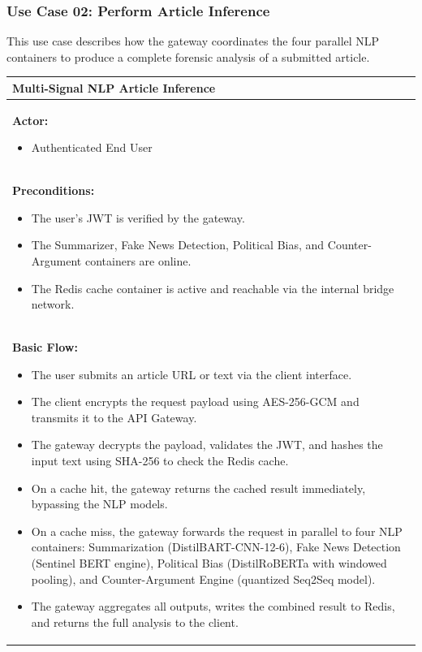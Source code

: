 \subsubsection{Use Case 02: Perform Article Inference}
This use case describes how the gateway coordinates the four parallel NLP containers to produce a complete forensic analysis of a submitted article.
\begin{table}[H]
    \renewcommand{\arraystretch}{1.3}
    \begin{tabularx}{\textwidth}{| X |}
        \hline
        \textbf{Multi-Signal NLP Article Inference} \\
        \hline
        \textbf{Actor:}
        \begin{itemize}
            \item Authenticated End User
        \end{itemize} \\
        \hline
        \textbf{Preconditions:}
        \begin{itemize}
            \item The user's JWT is verified by the gateway.
            \item The Summarizer, Fake News Detection, Political Bias, and Counter-Argument containers are online.
            \item The Redis cache container is active and reachable via the internal bridge network.
        \end{itemize} \\
        \hline
        \textbf{Basic Flow:}
        \begin{itemize}
            \item The user submits an article URL or text via the client interface.
            \item The client encrypts the request payload using AES-256-GCM and transmits it to the API Gateway.
            \item The gateway decrypts the payload, validates the JWT, and hashes the input text using SHA-256 to check the Redis cache.
            \item On a cache hit, the gateway returns the cached result immediately, bypassing the NLP models.
            \item On a cache miss, the gateway forwards the request in parallel to four NLP containers: Summarization (DistilBART-CNN-12-6), Fake News Detection (Sentinel BERT engine), Political Bias (DistilRoBERTa with windowed pooling), and Counter-Argument Engine (quantized Seq2Seq model).
            \item The gateway aggregates all outputs, writes the combined result to Redis, and returns the full analysis to the client.

\end{itemize}
\end{tabularx}
\end{table}
